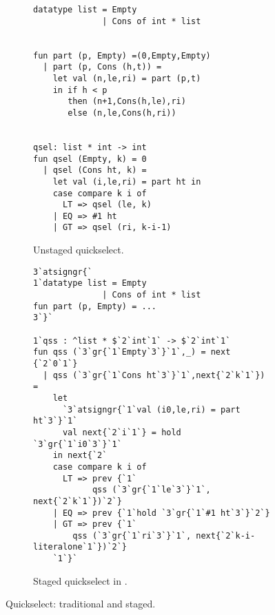 
\begin{figure}[t]
\begin{subfigure}{0.5\textwidth}
\begin{lstlisting} 
datatype list = Empty 
              | Cons of int * list


fun part (p, Empty) =(0,Empty,Empty) 
  | part (p, Cons (h,t)) = 
    let val (n,le,ri) = part (p,t) 
    in if h < p 
       then (n+1,Cons(h,le),ri) 
       else (n,le,Cons(h,ri))


qsel: list * int -> int
fun qsel (Empty, k) = 0
  | qsel (Cons ht, k) =
    let val (i,le,ri) = part ht in 
    case compare k i of
      LT => qsel (le, k)
    | EQ => #1 ht
    | GT => qsel (ri, k-i-1)

\end{lstlisting}
\caption{Unstaged quickselect.}
\label{fig:qs-unstaged}
\end{subfigure}
\hfill
\begin{subfigure}{0.5\textwidth}
\begin{lstlisting} 
3`atsigngr{`  
1`datatype list = Empty 
              | Cons of int * list
fun part (p, Empty) = ... 
3`}`

1`qss : ^list * $`2`int`1` -> $`2`int`1`
fun qss (`3`gr{`1`Empty`3`}`1`,_) = next {`2`0`1`}
  | qss (`3`gr{`1`Cons ht`3`}`1`,next{`2`k`1`}) = 
    let 
      `3`atsigngr{`1`val (i0,le,ri) = part ht`3`}`1`
      val next{`2`i`1`} = hold `3`gr{`1`i0`3`}`1`
    in next{`2` 
    case compare k i of
      LT => prev {`1`
            qss (`3`gr{`1`le`3`}`1`, next{`2`k`1`})`2`}
    | EQ => prev {`1`hold `3`gr{`1`#1 ht`3`}`2`}
    | GT => prev {`1`
        qss (`3`gr{`1`ri`3`}`1`, next{`2`k-i-literalone`1`})`2`}
    `1`}`
\end{lstlisting}
\caption{Staged quickselect in \lang.}

\label{fig:qs-staged}
\end{subfigure}
\caption{Quickselect: traditional and staged.}
\end{figure}

